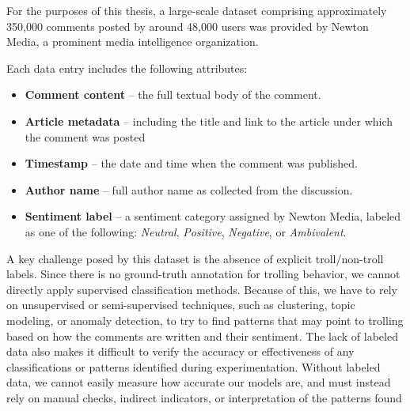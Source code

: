 \documentclass[twoside]{ctuthesis}
\theoremstyle{plain}
\theoremstyle{definition}
\theoremstyle{note}
\begin{document}
For the purposes of this thesis, a large-scale dataset comprising approximately 350,000 comments posted by around 48,000 users was provided by Newton Media, a prominent media intelligence organization.\par 

Each data entry includes the following attributes:
\begin{itemize}
    \item \textbf{Comment content} – the full textual body of the comment.
    
    \item \textbf{Article metadata} – including the title and link to the article under which the comment was posted
    
    \item \textbf{Timestamp} – the date and time when the comment was published.
    
    \item \textbf{Author name} – full author name as collected from the discussion.
    
    \item \textbf{Sentiment label} – a sentiment category assigned by Newton Media, labeled as one of the following: \textit{Neutral}, \textit{Positive}, \textit{Negative}, or \textit{Ambivalent}.
\end{itemize}

A key challenge posed by this dataset is the absence of explicit troll/non-troll labels. Since there is no ground-truth annotation for trolling behavior,  we cannot directly apply supervised classification methods. Because of this, we have to rely on unsupervised or semi-supervised techniques, such as clustering, topic modeling, or anomaly detection, to try to find patterns that may point to trolling based on how the comments are written and their sentiment. The lack of labeled data also makes it difficult to verify the accuracy or effectiveness of any classifications or patterns identified during experimentation. Without labeled data, we cannot easily measure how accurate our models are, and must instead rely on manual checks, indirect indicators, or interpretation of the patterns found\par

\appendix

\printindex

 

\end{document}
